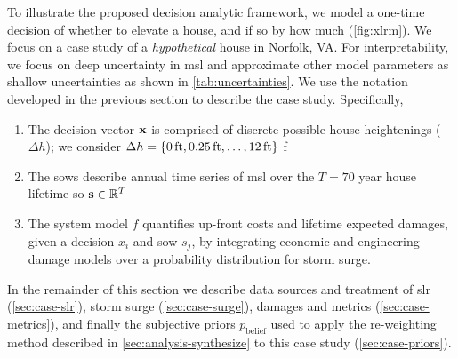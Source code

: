 \documentclass[11pt]{article}
\begin{document}
To illustrate the proposed decision analytic framework, we model a one-time decision of whether to elevate a house, and if so by how much (\cref{fig:xlrm}).
We focus on a case study of a \emph{hypothetical} house in Norfolk, VA.
For interpretability, we focus on deep uncertainty in \gls{msl} and approximate other model parameters as shallow uncertainties as shown in \cref{tab:uncertainties}.
We use the notation developed in the previous section to describe the case study.
Specifically,
\begin{enumerate}
    \item The decision vector $\vb{x}$ is comprised of discrete possible house heightenings ($\Delta h$); we consider $\Delta h = \qty{\SI{0}{ft}, \SI{0.25}{ft}, \ldots, \SI{12}{ft}}$ f
    \item The \glspl{sow} describe annual time series of \gls{msl} over the $T=70$ year house lifetime so $\vb{s} \in \mathbb{R}^T$
    \item The system model $f$ quantifies up-front costs and lifetime expected damages, given a decision $x_i$ and \gls{sow} $s_j$, by integrating economic and engineering damage models over a probability distribution for storm surge.
\end{enumerate}
In the remainder of this section we describe data sources and treatment of \gls{slr} (\cref{sec:case-slr}), storm surge (\cref{sec:case-surge}), damages and metrics (\cref{sec:case-metrics}), and finally the subjective priors $p_\mathrm{belief}$ used to apply the re-weighting method described in \cref{sec:analysis-synthesize} to this case study (\cref{sec:case-priors}).
\end{document}
